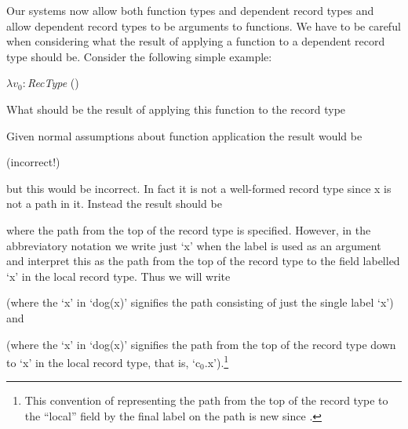 Our systems now allow both function types and dependent record types
and allow dependent record types to be arguments to functions.  We
have to be careful when considering what the result of applying a
function to a dependent record type should be.  Consider the following
simple example:
\begin{display}
$\lambda
v_0:$\textit{RecType} ()
\end{display}
What should be the result of applying this function to the record type
\begin{display}
\end{display}
Given normal assumptions about function application the result would
be
\begin{display}
 (incorrect!)
\end{display}
but this would be incorrect.  In fact it is not a well-formed record
type since x is not a path in it.  Instead the result should be 
\begin{display}
\end{display}
where the path from the top of the record type is specified.  However,
in the abbreviatory notation we write just `x' when the label is used
as an argument and interpret this as the path from the top of the
record type to the field labelled `x' in the local record type.  Thus
we will write
\begin{display}
\end{display}
(where the `x' in `dog(x)' signifies the path consisting of just the
single label `x') and
\begin{display}
\end{display}
(where the `x' in `dog(x)' signifies the path from the top of the
record type down to `x' in the local
record type, that is, `c$_0$.x').\footnote{This convention of
  representing the path from the top of the record type to the
  ``local'' field by the final label on the path is new since \cite{Cooper2012}.}

